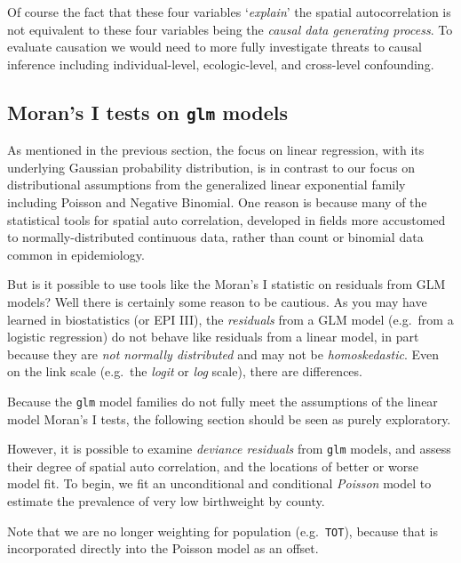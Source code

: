 \documentclass[
]{book}
\newenvironment{rmdcaution}[1]
  {
  \begin{itemize}
  \renewcommand{\labelitemi}{
    \raisebox{-.7\height}[0pt][0pt]{
      {\setkeys{Gin}{width=3em,keepaspectratio}\texttt{[image: images/\#1]}}
    }
  }
  \setlength{\fboxsep}{1em}
  \begin{caution}
  \item
  }
  {
  \end{caution}
  \end{itemize}
  }
\begin{document}
Of course the fact that these four variables `\emph{explain}' the spatial autocorrelation is not equivalent to these four variables being the \emph{causal data generating process}. To evaluate causation we would need to more fully investigate threats to causal inference including individual-level, ecologic-level, and cross-level confounding.

\hypertarget{morans-i-tests-on-glm-models}{%
\subsection{\texorpdfstring{Moran's I tests on \texttt{glm} models}{Moran's I tests on glm models}}\label{morans-i-tests-on-glm-models}}

As mentioned in the previous section, the focus on linear regression, with its underlying Gaussian probability distribution, is in contrast to our focus on distributional assumptions from the generalized linear exponential family including Poisson and Negative Binomial. One reason is because many of the statistical tools for spatial auto correlation, developed in fields more accustomed to normally-distributed continuous data, rather than count or binomial data common in epidemiology.

But is it possible to use tools like the Moran's I statistic on residuals from GLM models? Well there is certainly some reason to be cautious. As you may have learned in biostatistics (or EPI III), the \emph{residuals} from a GLM model (e.g.~from a logistic regression) do not behave like residuals from a linear model, in part because they are \emph{not normally distributed} and may not be \emph{homoskedastic}. Even on the link scale (e.g.~the \emph{logit} or \emph{log} scale), there are differences.

\begin{rmdcaution}{caution}
Because the \texttt{glm} model families do not fully meet the assumptions of the linear model Moran's I tests, the following section should be seen as purely exploratory.

\end{rmdcaution}

However, it is possible to examine \emph{deviance residuals} from \texttt{glm} models, and assess their degree of spatial auto correlation, and the locations of better or worse model fit. To begin, we fit an unconditional and conditional \emph{Poisson} model to estimate the prevalence of very low birthweight by county.

Note that we are no longer weighting for population (e.g.~\texttt{TOT}), because that is incorporated directly into the Poisson model as an offset.
\end{document}
